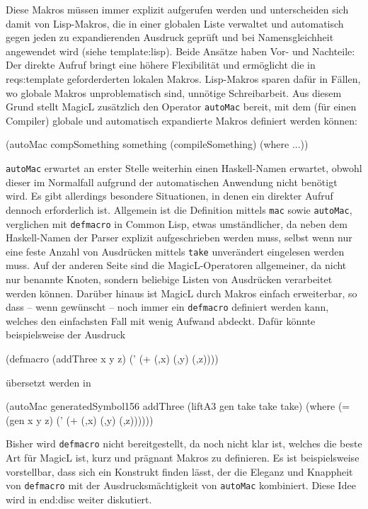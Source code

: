 \documentclass[11pt, a4paper, bibgerm]{scrbook}
\newenvironment{DIFnomarkup}{}{}
\newcommand\icode[1]{\lstinline?#1?}
\newcommand\sref{}
\newcommand{\sees}[1]{(siehe \sref{#1})}
\begin{document}
Diese Makros müssen immer explizit aufgerufen werden und unterscheiden
sich damit von Lisp-Makros, die in einer globalen Liste verwaltet und
automatisch gegen jeden zu expandierenden Ausdruck geprüft und bei
Namensgleichheit angewendet wird \sees{template:lisp}. Beide Ansätze
haben Vor- und Nachteile: Der direkte Aufruf bringt eine höhere
Flexibilität und ermöglicht die in \sref{reqs:template} geforderderten
lokalen Makros. Lisp-Makros sparen dafür in Fällen, wo globale Makros
unproblematisch sind, unnötige Schreibarbeit. Aus diesem Grund stellt
MagicL zusätzlich den Operator \icode{autoMac} bereit, mit dem (für
einen Compiler) globale und automatisch expandierte Makros definiert
werden können:
\begin{DIFnomarkup}\begin{code}
(autoMac compSomething something
    (compileSomething)
  (where ...))
\end{code}\end{DIFnomarkup}
\icode{autoMac} erwartet an erster Stelle weiterhin einen Haskell-Namen
erwartet, obwohl dieser im Normalfall aufgrund der automatischen
Anwendung nicht benötigt wird. Es gibt allerdings besondere Situationen,
in denen ein direkter Aufruf dennoch erforderlich ist. Allgemein ist die
Definition mittels \icode{mac} sowie \icode{autoMac}, verglichen mit
\icode{defmacro} in Common Lisp, etwas umständlicher, da neben dem
Haskell-Namen der Parser explizit aufgeschrieben werden muss, selbst
wenn nur eine feste Anzahl von Ausdrücken mittels \icode{take}
unverändert eingelesen werden muss. Auf der anderen Seite sind die
MagicL-Operatoren allgemeiner, da nicht nur benannte Knoten, sondern
beliebige Listen von Ausdrücken verarbeitet werden können. Darüber
hinaus ist MagicL durch Makros einfach erweiterbar, so dass -- wenn
gewünscht -- noch immer ein \icode{defmacro} definiert werden kann,
welches den einfachsten Fall mit wenig Aufwand abdeckt. Dafür könnte
beispielsweise der Ausdruck
\begin{DIFnomarkup}\begin{code}
(defmacro (addThree x y z)
  (' (+ (,x) (,y) (,z))))
\end{code}\end{DIFnomarkup}
übersetzt werden in
\begin{DIFnomarkup}\begin{code}
(autoMac generatedSymbol156 addThree
   (liftA3 gen take take take)
  (where (= (gen x y z)
            (' (+ (,x) (,y) (,z))))))
\end{code}\end{DIFnomarkup}
Bisher wird \icode{defmacro} nicht bereitgestellt, da noch nicht klar
ist, welches die beste Art für MagicL ist, kurz und prägnant Makros zu
definieren. Es ist beispielsweise vorstellbar, dass sich ein Konstrukt
finden lässt, der die Eleganz und Knappheit von \icode{defmacro} mit der
Ausdrucksmächtigkeit von \icode{autoMac} kombiniert. Diese Idee wird in
\sref{end:disc} weiter diskutiert.
\end{document}
